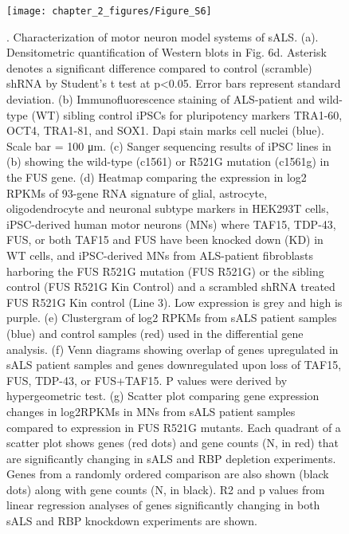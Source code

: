 \begin{figure}[ht]
  \centering
  \texttt{[image: chapter\_2\_figures/Figure\_S6]}
  \caption[Supplementary Figure 6]{. Characterization of motor neuron model systems of sALS. (a). Densitometric quantification of Western blots in Fig. 6d. Asterisk denotes a significant difference compared to control (scramble) shRNA by Student’s t test at p<0.05. Error bars represent standard deviation. (b) Immunofluorescence staining of ALS-patient and wild-type (WT) sibling control iPSCs for pluripotency markers TRA1-60, OCT4, TRA1-81, and SOX1. Dapi stain marks cell nuclei (blue). Scale bar = 100 μm.  (c) Sanger sequencing results of iPSC lines in (b) showing the wild-type (c1561) or R521G mutation (c1561g) in the FUS gene. (d) Heatmap comparing the expression in log2 RPKMs of 93-gene RNA signature of glial, astrocyte, oligodendrocyte and neuronal subtype markers in HEK293T cells, iPSC-derived human motor neurons (MNs) where TAF15, TDP-43, FUS, or both TAF15 and FUS have been knocked down (KD) in WT cells, and iPSC-derived MNs from ALS-patient fibroblasts harboring the FUS R521G mutation (FUS R521G) or the sibling control (FUS R521G Kin Control) and a scrambled shRNA treated FUS R521G Kin control (Line 3). Low expression is grey and high is purple. (e) Clustergram of log2 RPKMs from sALS patient samples (blue) and control samples (red) used in the differential gene analysis. (f) Venn diagrams showing overlap of genes upregulated in sALS patient samples and genes downregulated upon loss of TAF15, FUS, TDP-43, or FUS+TAF15. P values were derived by hypergeometric test. (g) Scatter plot comparing gene expression changes in log2RPKMs in MNs from sALS patient samples compared to expression in FUS R521G mutants. Each quadrant of a scatter plot shows genes (red dots) and gene counts (N, in red) that are significantly changing in sALS and RBP depletion experiments. Genes from a randomly ordered comparison are also shown (black dots) along with gene counts (N, in black). R2 and p values from linear regression analyses of genes significantly changing in both sALS and RBP knockdown experiments are shown.}
  \label{fig:Figure_S6}
\end{figure}

